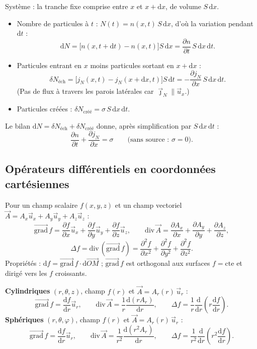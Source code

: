 \documentclass[11pt,a4paper]{article}
\newcommand{\vect}[1]{\overrightarrow{#1}}
\newcommand{\jn}{\vec{\jmath}_N}
\newcommand{\grad}{\vect{\mathrm{grad}}\,}
\renewcommand{\div}{\mathrm{div}\,}
\newcommand{\dd}{\mathrm{d}}
\newcommand{\ux}{\vec{u}_x}
\newcommand{\ur}{\vec{u}_r}
\newcommand{\pd}[2]{\dfrac{\partial #1}{\partial #2}}
\newcommand{\pdd}[2]{\dfrac{\partial^2 #1}{\partial #2^2}}
\begin{document}
\begin{demo}[title={Démonstration : équation locale de conservation à 1D}]
Système : la tranche fixe comprise entre $x$ et $x+\dd x$, de volume $S\,\dd x$.
\begin{itemize}[leftmargin=1.5em]
  \item Nombre de particules à $t$ : $N(t)=n(x,t)\,S\,\dd x$, d'où la variation pendant $\dd t$ :
        \[ \dd N = \big[n(x,t+\dd t)-n(x,t)\big]S\,\dd x = \pd{n}{t}\,S\,\dd x\,\dd t. \]
  \item Particules entrant en $x$ moins particules sortant en $x+\dd x$ :
        \[ \delta N_{\text{éch}} = \big[j_N(x,t)-j_N(x+\dd x,t)\big]S\,\dd t
           = -\pd{j_N}{x}\,S\,\dd x\,\dd t. \]
        (Pas de flux à travers les parois latérales car $\jn\parallel\ux$.)
  \item Particules créées : $\delta N_{\text{créé}}=\sigma\,S\,\dd x\,\dd t$.
\end{itemize}
Le bilan $\dd N=\delta N_{\text{éch}}+\delta N_{\text{créé}}$ donne, après simplification par
$S\,\dd x\,\dd t$ :
\[ \boxed{\pd{n}{t} + \pd{j_N}{x} = \sigma}
   \qquad\text{(sans source : } \sigma=0\text{).} \]
\end{demo}

\subsection{Opérateurs différentiels en coordonnées cartésiennes}

\begin{formule}[title={Opérateurs en cartésiennes}]
Pour un champ scalaire $f(x,y,z)$ et un champ vectoriel $\vec A=A_x\ux+A_y\vec u_y+A_z\vec u_z$ :
\[
\grad f = \pd{f}{x}\ux + \pd{f}{y}\vec u_y + \pd{f}{z}\vec u_z,
\qquad
\div\vec A = \pd{A_x}{x}+\pd{A_y}{y}+\pd{A_z}{z},
\]
\[
\Delta f = \div\left(\grad f\right) = \pdd{f}{x}+\pdd{f}{y}+\pdd{f}{z}.
\]
Propriétés : $\dd f = \grad f\cdot\dd\vect{OM}$ ; $\grad f$ est orthogonal aux surfaces
$f=\text{cte}$ et dirigé vers les $f$ croissants.
\end{formule}

\begin{formule}[title={Formulaire (donné) en cylindriques et sphériques, cas utiles}]
\textbf{Cylindriques} $(r,\theta,z)$, champ $f(r)$ et $\vec A=A_r(r)\,\ur$ :
\[ \grad f=\dfrac{\dd f}{\dd r}\ur,\qquad
   \div\vec A=\dfrac1r\dfrac{\dd (rA_r)}{\dd r},\qquad
   \Delta f=\dfrac1r\dfrac{\dd}{\dd r}\!\left(r\dfrac{\dd f}{\dd r}\right). \]
\textbf{Sphériques} $(r,\theta,\varphi)$, champ $f(r)$ et $\vec A=A_r(r)\,\ur$ :
\[ \grad f=\dfrac{\dd f}{\dd r}\ur,\qquad
   \div\vec A=\dfrac1{r^2}\dfrac{\dd (r^2A_r)}{\dd r},\qquad
   \Delta f=\dfrac1{r^2}\dfrac{\dd}{\dd r}\!\left(r^2\dfrac{\dd f}{\dd r}\right). \]
\end{formule}
\end{document}
